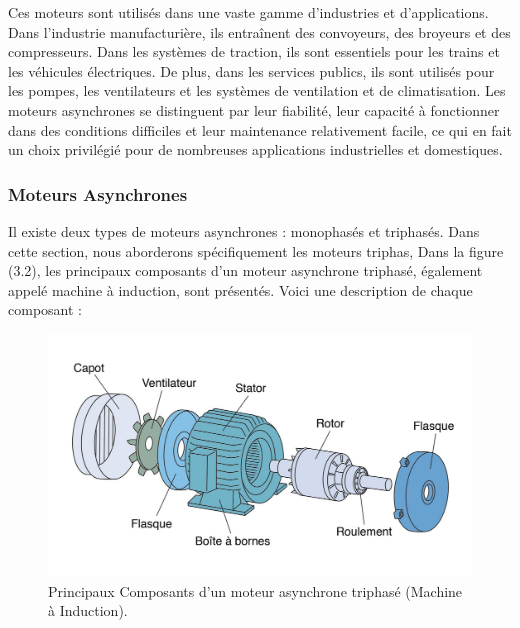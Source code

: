 Ces moteurs sont utilisés dans une vaste gamme d'industries et d'applications.
Dans l'industrie manufacturière, ils entraînent des convoyeurs, des broyeurs et
des compresseurs. Dans les systèmes de traction, ils sont essentiels pour les
trains et les véhicules électriques. De plus, dans les services publics, ils
sont utilisés pour les pompes, les ventilateurs et les systèmes de ventilation
et de climatisation. Les moteurs asynchrones se distinguent par leur fiabilité,
leur capacité à fonctionner dans des conditions difficiles et leur maintenance
relativement facile, ce qui en fait un choix privilégié pour de nombreuses
applications industrielles et domestiques.

\subsubsection{Moteurs Asynchrones}

Il existe deux types de moteurs asynchrones : monophasés et triphasés. Dans
cette section, nous aborderons spécifiquement les moteurs triphas, Dans la
figure (3.2), les principaux composants d'un moteur asynchrone triphasé,
également appelé machine à induction, sont présentés. Voici une description de
chaque composant :

\begin{figure}[hbt!]
	\centering
	\includegraphics[width=12cm]{images_pfe/motor.jpg}
	\caption{
		Principaux Composants d'un moteur asynchrone triphasé (Machine à Induction).}
	\label{fig:moteu-asynchrone}
\end{figure}
\FloatBarrier

